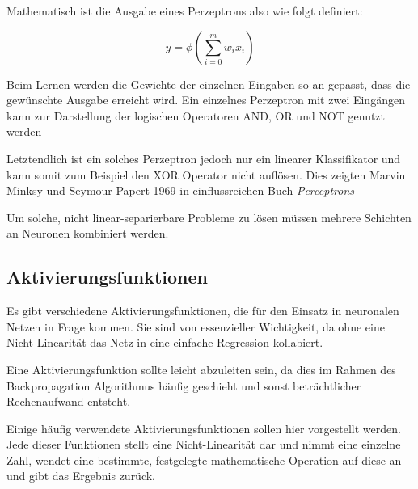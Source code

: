 Mathematisch ist die Ausgabe eines Perzeptrons also wie folgt definiert:

\begin{equation}
	y = \phi ( \sum_{i= 0}^{m} w_i x_i)
\end{equation}

Beim Lernen werden die Gewichte der einzelnen Eingaben so an gepasst, dass die gewünschte Ausgabe erreicht wird.
Ein einzelnes Perzeptron mit zwei Eingängen kann zur Darstellung der logischen Operatoren AND, OR und NOT genutzt werden

Letztendlich ist ein solches Perzeptron jedoch nur ein linearer Klassifikator und kann somit zum Beispiel den XOR Operator nicht auflösen.
Dies zeigten Marvin Minksy und Seymour Papert 1969 in einflussreichen Buch \textit{Perceptrons} 

Um solche, nicht linear-separierbare Probleme zu lösen müssen mehrere Schichten an Neuronen kombiniert werden.

\subsection{Aktivierungsfunktionen}
\label{activationfuncs}
Es gibt verschiedene Aktivierungsfunktionen, die für den Einsatz in neuronalen Netzen in Frage kommen.
Sie sind von essenzieller Wichtigkeit, da ohne eine Nicht-Linearität das Netz in eine einfache Regression kollabiert.

Eine Aktivierungsfunktion sollte leicht abzuleiten sein, 
da dies im Rahmen des Backpropagation Algorithmus häufig geschieht und sonst beträchtlicher Rechenaufwand entsteht.

Einige häufig verwendete Aktivierungsfunktionen sollen hier vorgestellt werden.
Jede dieser Funktionen stellt eine Nicht-Linearität dar und nimmt eine einzelne Zahl, wendet eine bestimmte, festgelegte mathematische 
Operation auf diese an und gibt das Ergebnis zurück.

